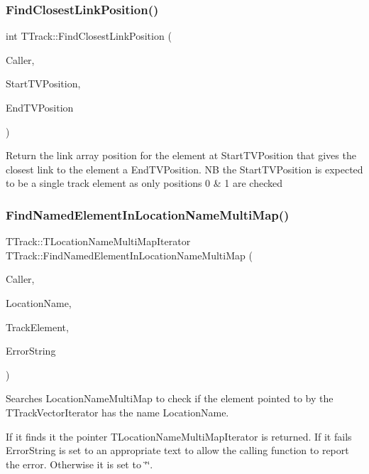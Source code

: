 \subsubsection{\texorpdfstring{Find\+Closest\+Link\+Position()}{FindClosestLinkPosition()}}
{\footnotesize\ttfamily int T\+Track\+::\+Find\+Closest\+Link\+Position (\begin{DoxyParamCaption}\item[{int}]{Caller,  }\item[{int}]{Start\+T\+V\+Position,  }\item[{int}]{End\+T\+V\+Position }\end{DoxyParamCaption})}

Return the link array position for the element at Start\+T\+V\+Position that gives the closest link to the element a End\+T\+V\+Position. NB the Start\+T\+V\+Position is expected to be a single track element as only positions 0 \& 1 are checked \mbox{\label{class_t_track_a694370e3ec67d43da1d8333e06d9ebba}} 
\subsubsection{\texorpdfstring{Find\+Named\+Element\+In\+Location\+Name\+Multi\+Map()}{FindNamedElementInLocationNameMultiMap()}}
{\footnotesize\ttfamily T\+Track\+::\+T\+Location\+Name\+Multi\+Map\+Iterator T\+Track\+::\+Find\+Named\+Element\+In\+Location\+Name\+Multi\+Map (\begin{DoxyParamCaption}\item[{int}]{Caller,  }\item[{Ansi\+String}]{Location\+Name,  }\item[{T\+Track\+Vector\+Iterator}]{Track\+Element,  }\item[{Ansi\+String \&}]{Error\+String }\end{DoxyParamCaption})}

Searches Location\+Name\+Multi\+Map to check if the element pointed to by the T\+Track\+Vector\+Iterator has the name Location\+Name.

If it finds it the pointer T\+Location\+Name\+Multi\+Map\+Iterator is returned. If it fails Error\+String is set to an appropriate text to allow the calling function to report the error. Otherwise it is set to \char`\"{}\char`\"{}. \mbox{\label{class_t_track_a5b63dde2b21a37d5db7e4d078b03a74c}} 
